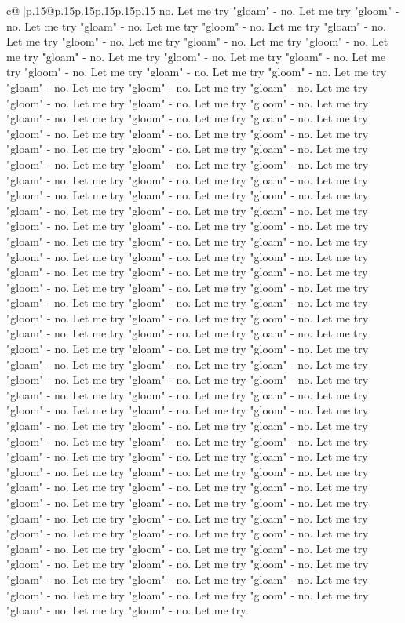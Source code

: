 \documentclass{article}
\begin{document}
{\begin{supertabular}{c@{$\;$}|p{.15\linewidth}@{}p{.15\linewidth}p{.15\linewidth}p{.15\linewidth}p{.15\linewidth}p{.15\linewidth}}
{{{no. Let me try "gloam" {-} no. Let me try "gloom" {-} no. Let me try "gloam" {-} no. Let me try "gloom" {-} no. Let me try "gloam" {-} no. Let me try "gloom" {-} no. Let me try "gloam" {-} no. Let me try "gloom" {-} no. Let me try "gloam" {-} no. Let me try "gloom" {-} no. Let me try "gloam" {-} no. Let me try "gloom" {-} no. Let me try "gloam" {-} no. Let me try "gloom" {-} no. Let me try "gloam" {-} no. Let me try "gloom" {-} no. Let me try "gloam" {-} no. Let me try "gloom" {-} no. Let me try "gloam" {-} no. Let me try "gloom" {-} no. Let me try "gloam" {-} no. Let me try "gloom" {-} no. Let me try "gloam" {-} no. Let me try "gloom" {-} no. Let me try "gloam" {-} no. Let me try "gloom" {-} no. Let me try "gloam" {-} no. Let me try "gloom" {-} no. Let me try "gloam" {-} no. Let me try "gloom" {-} no. Let me try "gloam" {-} no. Let me try "gloom" {-} no. Let me try "gloam" {-} no. Let me try "gloom" {-} no. Let me try "gloam" {-} no. Let me try "gloom" {-} no. Let me try "gloam" {-} no. Let me try "gloom" {-} no. Let me try "gloam" {-} no. Let me try "gloom" {-} no. Let me try "gloam" {-} no. Let me try "gloom" {-} no. Let me try "gloam" {-} no. Let me try "gloom" {-} no. Let me try "gloam" {-} no. Let me try "gloom" {-} no. Let me try "gloam" {-} no. Let me try "gloom" {-} no. Let me try "gloam" {-} no. Let me try "gloom" {-} no. Let me try "gloam" {-} no. Let me try "gloom" {-} no. Let me try "gloam" {-} no. Let me try "gloom" {-} no. Let me try "gloam" {-} no. Let me try "gloom" {-} no. Let me try "gloam" {-} no. Let me try "gloom" {-} no. Let me try "gloam" {-} no. Let me try "gloom" {-} no. Let me try "gloam" {-} no. Let me try "gloom" {-} no. Let me try "gloam" {-} no. Let me try "gloom" {-} no. Let me try "gloam" {-} no. Let me try "gloom" {-} no. Let me try "gloam" {-} no. Let me try "gloom" {-} no. Let me try "gloam" {-} no. Let me try "gloom" {-} no. Let me try "gloam" {-} no. Let me try "gloom" {-} no. Let me try "gloam" {-} no. Let me try "gloom" {-} no. Let me try "gloam" {-} no. Let me try "gloom" {-} no. Let me try "gloam" {-} no. Let me try "gloom" {-} no. Let me try "gloam" {-} no. Let me try "gloom" {-} no. Let me try "gloam" {-} no. Let me try "gloom" {-} no. Let me try "gloam" {-} no. Let me try "gloom" {-} no. Let me try "gloam" {-} no. Let me try "gloom" {-} no. Let me try "gloam" {-} no. Let me try "gloom" {-} no. Let me try "gloam" {-} no. Let me try "gloom" {-} no. Let me try "gloam" {-} no. Let me try "gloom" {-} no. Let me try "gloam" {-} no. Let me try "gloom" {-} no. Let me try "gloam" {-} no. Let me try "gloom" {-} no. Let me try "gloam" {-} no. Let me try "gloom" {-} no. Let me try "gloam" {-} no. Let me try "gloom" {-} no. Let me try "gloam" {-} no. Let me try "gloom" {-} no. Let me try "gloam" {-} no. Let me try "gloom" {-} no. Let me try "gloam" {-} no. Let me try "gloom" {-} no. Let me try "gloam" {-} no. Let me try "gloom" {-} no. Let me try "gloam" {-} no. Let me try "gloom" {-} no. Let me try "gloam" {-} no. Let me try "gloom" {-} no. Let me try "gloam" {-} no. Let me try "gloom" {-} no. Let me try "gloam" {-} no. Let me try "gloom" {-} no. Let me try "gloam" {-} no. Let me try "gloom" {-} no. Let me try }}}
\end{supertabular}}
\end{document}
